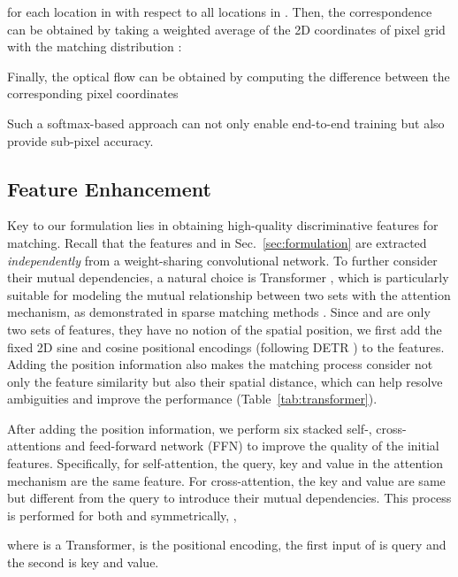 \documentclass[10pt,twocolumn,letterpaper]{article}
\begin{document}
for each location in  with respect to all locations in . Then, the correspondence  can be obtained by taking a weighted average of the 2D coordinates of pixel grid  with the matching distribution :

Finally, the optical flow  can be obtained by computing the difference between the corresponding pixel coordinates

Such a softmax-based approach can not only enable end-to-end training but also provide sub-pixel accuracy. 










\subsection{Feature Enhancement}

Key to our formulation lies in obtaining high-quality discriminative features for matching. Recall that the features  and  in Sec.~\ref{sec:formulation} are extracted \emph{independently} from a weight-sharing convolutional network. To further consider their mutual dependencies, a natural choice is Transformer \cite{vaswani2017attention}, which is particularly suitable for modeling the mutual relationship between two sets with the attention mechanism, as demonstrated in sparse matching methods \cite{sarlin2020superglue,sun2021loftr}.
Since  and  are only two sets of features, they have no notion of the spatial position, we first add the fixed 2D sine and cosine positional encodings (following DETR \cite{carion2020end}) to the features. Adding the position information also makes the matching process consider not only the feature similarity but also their spatial distance, which can help resolve ambiguities and improve the performance (Table~\ref{tab:transformer}).

After adding the position information, we perform six stacked self-, cross-attentions and feed-forward network (FFN) \cite{vaswani2017attention} to improve the quality of the initial features. Specifically, for self-attention, the query, key and value in the attention mechanism \cite{vaswani2017attention} are the same feature. For cross-attention, the key and value are same but different from the query to introduce their mutual dependencies. This process is performed for both  and  symmetrically, \ie,

where  is a Transformer,  is the positional encoding, the first input of  is query and the second is key and value.
\end{document}
